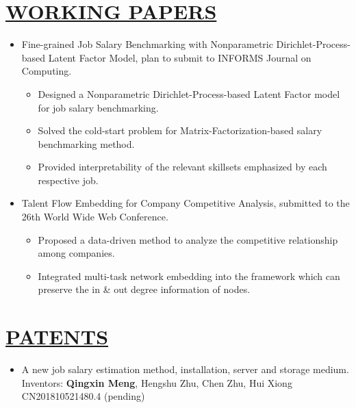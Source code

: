 \documentclass[11pt,letterpage]{res}
\begin{document}
\begin{resume}
\section{\underline{WORKING PAPERS}}
\begin{itemize}
	\item
Fine-grained Job Salary Benchmarking with Nonparametric Dirichlet-Process-based Latent Factor
Model, plan to submit to INFORMS Journal on Computing.
  \begin{itemize}
    \item Designed a Nonparametric Dirichlet-Process-based Latent Factor model for job salary benchmarking.
    \item Solved the cold-start problem for Matrix-Factorization-based salary benchmarking method.
    \item Provided interpretability of the relevant skillsets emphasized by each respective job.
  \end{itemize}
\item
Talent Flow Embedding for Company Competitive Analysis, submitted to the 26th World Wide Web Conference.
  \begin{itemize}
    \item Proposed a data-driven method to analyze the competitive relationship among companies.
    \item Integrated multi-task network embedding into the framework which can preserve the in \& out degree information of nodes.
  \end{itemize}
\end{itemize}

\section{\underline{PATENTS}}
\begin{itemize}
  \item A new job salary estimation method, installation, server and storage medium. \\
  \hspace*{0.40cm}Inventors: \textbf{Qingxin Meng}, Hengshu Zhu, Chen Zhu, Hui Xiong\\
  \hspace*{0.40cm}CN201810521480.4 (pending)
\end{itemize}


\end{resume}
\end{document}
